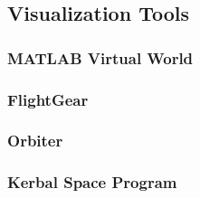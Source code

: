 \subsection{Visualization Tools}
\subsubsection{MATLAB Virtual World}
\subsubsection{FlightGear}
\subsubsection{Orbiter}
\subsubsection{Kerbal Space Program}